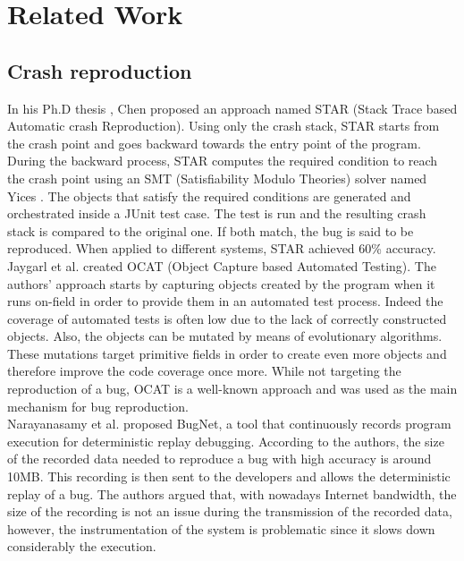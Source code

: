 
\chapter{Related Work\label{chap:relwork}}

\section{Crash reproduction}

In his Ph.D thesis \cite{Chen2013}, Chen proposed an approach named STAR (Stack Trace based Automatic crash Reproduction).
Using only the crash stack, STAR starts from the crash point and goes backward towards the entry point of the program.
During the backward process, STAR computes the required condition to reach the crash point using an SMT (Satisfiability Modulo Theories) solver named Yices \cite{Dutertre2006}.
The objects that satisfy the required conditions are generated and orchestrated inside a JUnit test case. The test is run and the resulting crash stack is compared to the original one. If both match, the bug is said to be reproduced. When applied to different systems, STAR achieved 60\% accuracy. \\

Jaygarl et al. \cite{Jaygarl} created OCAT (Object Capture based Automated Testing).
The authors’ approach starts by capturing objects created by the program when it runs on-field in order to provide them in an automated test process. Indeed the coverage of automated tests is often low due to the lack of correctly constructed objects.
Also, the objects can be mutated by means of evolutionary algorithms. These mutations target primitive fields in order to create even more objects and therefore improve the code coverage once more.
While not targeting the reproduction of a bug, OCAT is a well-known approach and was used as the main mechanism for bug reproduction. \\

Narayanasamy et al. \cite{Narayanasamy2005} proposed BugNet, a tool that continuously records program execution for deterministic replay debugging. According to the authors, the size of the recorded data needed to reproduce a bug with high accuracy is around 10MB. This recording is then sent to the developers and allows the deterministic replay of a bug. The authors argued that, with nowadays Internet bandwidth, the size of the recording is not an issue during the transmission of the recorded data, however, the instrumentation of the system is problematic since it slows down considerably the execution.\\

